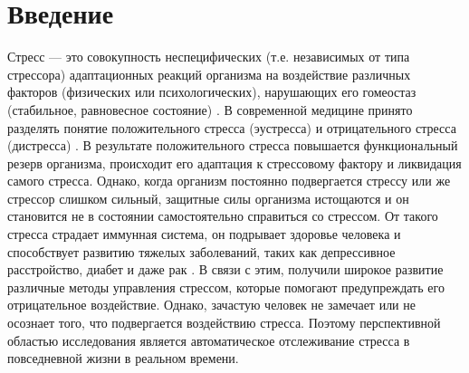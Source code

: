 \documentclass[14pt]{matmex-diploma-custom}
\begin{document}
\maketitle
\tableofcontents

\section*{Введение}
Стресс --- это совокупность неспецифических (т.е. независимых от типа стрессора)
адаптационных реакций организма на воздействие различных факторов (физических
или психологических), нарушающих его гомеостаз (стабильное, равновесное
состояние) \cite{book:stress_of_life}. В современной медицине принято разделять
понятие положительного стресса (эустресса) и отрицательного стресса (дистресса)
\cite{article:eustress_distress}. В результате положительного стресса повышается
функциональный резерв организма, происходит его адаптация к стрессовому фактору
и ликвидация самого стресса. Однако, когда организм постоянно подвергается
стрессу или же стрессор слишком сильный, защитные силы организма истощаются и он
становится не в состоянии самостоятельно справиться со стрессом. От такого
стресса страдает иммунная система, он подрывает здоровье человека и способствует
развитию тяжелых заболеваний, таких как депрессивное расстройство, диабет и даже
рак \cite{article:stress_and_illness}. В связи с этим, получили широкое развитие
различные методы управления стрессом, которые помогают предупреждать его
отрицательное воздействие. Однако, зачастую человек не замечает или не осознает
того, что подвергается воздействию стресса. Поэтому перспективной областью
исследования является автоматическое отслеживание стресса в повседневной жизни в
реальном времени.
\end{document}
